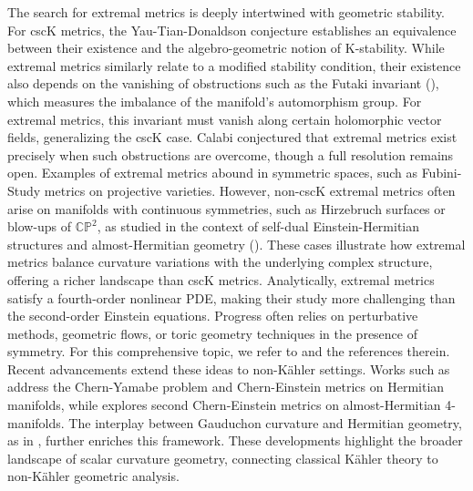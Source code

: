 \documentclass[12pt]{amsart}
\theoremstyle{plain}
\theoremstyle{definition}
\renewcommand{\>}{\rightarrow}
\newcommand{\C}{{\mathbb C}}
\renewcommand{\P}{{\mathbb P}}
\renewcommand{\#}{\sharp}
\numberwithin{equation}{section} %
\begin{document}
    The search for extremal metrics is deeply intertwined with geometric stability.
    For cscK metrics, the Yau-Tian-Donaldson conjecture establishes an equivalence
    between their existence and the algebro-geometric notion of K-stability.
    While extremal metrics similarly relate to a modified stability condition,
    their existence also depends on the vanishing of obstructions such as the Futaki
    invariant (\cite{Futaki1983}), which measures the imbalance of the
    manifold’s automorphism group. For extremal metrics,
    this invariant must vanish along certain holomorphic vector fields, generalizing the
    cscK case. Calabi conjectured that extremal metrics exist precisely when such
    obstructions are overcome, though a full resolution remains open. Examples of extremal metrics abound in symmetric spaces, such as Fubini-Study metrics on projective varieties. However, non-cscK extremal metrics often arise on manifolds with continuous symmetries, such as Hirzebruch surfaces or blow-ups of  $\C\P^2$, as studied in the context of self-dual Einstein-Hermitian structures  and almost-Hermitian geometry (\cite{ Apostolov1999, Apostolov1996, AP09}). These cases illustrate how extremal metrics balance curvature variations with the underlying complex structure, offering a richer landscape than cscK metrics.  Analytically, extremal metrics satisfy a fourth-order nonlinear PDE, making their study more challenging than the second-order Einstein equations. Progress often relies on perturbative methods, geometric flows, or toric geometry techniques in the presence of symmetry. For this comprehensive topic, we refer to \cite{Calabi1985, Chen2009, Chen-Cheng2021a, Chen-Cheng2021b, CDS15, ChenHe2008,Chen-Sun2014, Don99, Don01, Donaldson2008, Futaki1988, LS94, LWZ2018, Ross06, RT06, Stoppa08, Szekelyhidi2007, Szekelyhidi2014, Tian2002, TW2007} and the references therein.\\

    Recent advancements extend these ideas to non-Kähler settings. Works such as \cite{Angella2017, Angella2020, Lejmi2018} address the Chern-Yamabe problem and Chern-Einstein metrics on Hermitian manifolds, while \cite{BL23} explores second Chern-Einstein metrics on almost-Hermitian 4-manifolds. The interplay between Gauduchon curvature and Hermitian geometry, as in \cite{Broder2023, Fu2012, Fu2022,LiuYang2017,WangYang2022,Yang2019TAMS, Yang2020MZ, YangZheng2018, Zheng2019}, further enriches this framework. These developments highlight the broader landscape of scalar curvature geometry, connecting classical K\"ahler theory to  non-Kähler geometric analysis.\\
\end{document}
